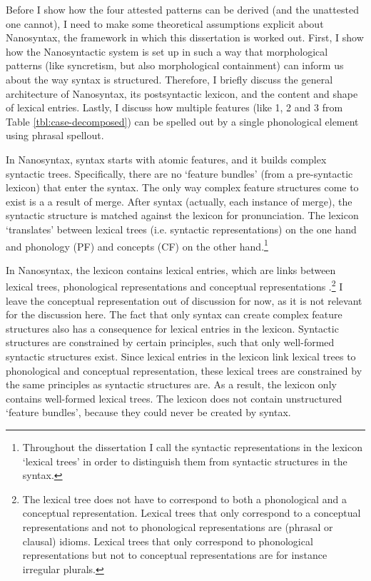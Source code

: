 Before I show how the four attested patterns can be derived (and the unattested one cannot), I need to make some theoretical assumptions explicit about Nanosyntax, the framework in which this dissertation is worked out. First, I show how the Nanosyntactic system is set up in such a way that morphological patterns (like syncretism, but also morphological containment) can inform us about the way syntax is structured. Therefore, I briefly discuss the general architecture of Nanosyntax, its postsyntactic lexicon, and the content and shape of lexical entries. Lastly, I discuss how multiple features (like 1, 2 and 3 from Table \ref{tbl:case-decomposed}) can be spelled out by a single phonological element using phrasal spellout.

In Nanosyntax, syntax starts with atomic features, and it builds complex syntactic trees. Specifically, there are no `feature bundles' (from a pre-syntactic lexicon) that enter the syntax. The only way complex feature structures come to exist is a a result of merge.
After syntax (actually, each instance of merge), the syntactic structure is matched against the lexicon for pronunciation. The lexicon `translates' between lexical trees (i.e. syntactic representations) on the one hand and phonology (PF) and concepts (CF) on the other hand.\footnote{
Throughout the dissertation I call the syntactic representations in the lexicon `lexical trees' in order to distinguish them from syntactic structures in the syntax.
}

In Nanosyntax, the lexicon contains lexical entries, which are links between lexical trees, phonological representations and conceptual representations \citep{starke2014}.\footnote{
The lexical tree does not have to correspond to both a phonological and a conceptual representation. Lexical trees that only correspond to a conceptual representations and not to phonological representations are (phrasal or clausal) idioms. Lexical trees that only correspond to phonological representations but not to conceptual representations are for instance irregular plurals.
} I leave the conceptual representation out of discussion for now, as it is not relevant for the discussion here. The fact that only syntax can create complex feature structures also has a consequence for lexical entries in the lexicon.
Syntactic structures are constrained by certain principles, such that only well-formed syntactic structures exist. Since lexical entries in the lexicon link lexical trees to phonological and conceptual representation, these lexical trees are constrained by the same principles as syntactic structures are.
As a result, the lexicon only contains well-formed lexical trees. The lexicon does not contain unstructured `feature bundles', because they could never be created by syntax.

